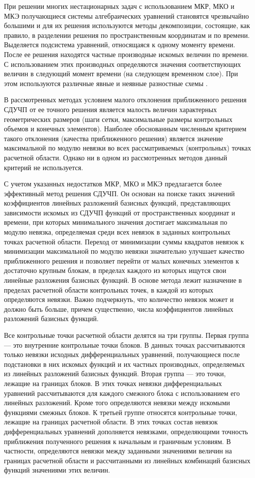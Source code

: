 \documentclass[a4paper,12pt]{article}
\begin{document}
При решении многих нестационарных задач с использованием МКР, МКО и
МКЭ получающиеся системы алгебраических уравнений становятся
чрезвычайно большими и для их решения используются методы
декомпозиции, состоящие, как правило, в разделении решения по
пространственным координатам и по времени.  Выделяется подсистема
уравнений, относящаяся к одному моменту времени.  После ее решения
находятся частные производные искомых величин по времени.  С
использованием этих производных определяются значения соответствующих
величин в следующий момент времени (на следующем временном слое). При
этом используются различные явные и неявные разностные схемы
\cite{J2012}.

В рассмотренных методах условием малого отклонения приближенного решения
СДУЧП от ее точного решения является малость величин характерных
геометрических размеров (шаги сетки, максимальные размеры контрольных
объемов и конечных элементов). Наиболее обоснованным численным критерием
такого отклонения (качества приближенного решения) является значение
максимальной по модулю невязки во всех рассматриваемых (контрольных) точках
расчетной области. Однако ни в одном из рассмотренных методов данный
критерий не используется. 

С учетом указанных недостатков МКР, МКО и МКЭ предлагается более
эффективный метод решения СДУЧП. Он основан на поиске таких значений
коэффициентов линейных разложений базисных функций, представляющих
зависимости искомых из СДУЧП функций от пространственных координат и
времени, при которых минимального значения достигает максимальная по модулю
невязка, определяемая среди всех невязок в заданных контрольных точках
расчетной области. Переход от минимизации суммы квадратов невязок к
минимизации максимальной по модулю невязки значительно улучшает качество
приближенного решения и позволяет перейти от малых конечных элементов к
достаточно крупным блокам, в пределах каждого из которых ищутся свои
линейные разложения базисных функций. В основе метода лежит назначение в
пределах расчетной области контрольных точек, в каждой из которых
определяются невязки. Важно подчеркнуть, что количество невязок может
и должно быть больше, причем существенно, числа коэффициентов линейных
разложений базисных функций.

Все контрольные точки расчетной области делятся на три группы. Первая
группа — это внутренние контрольные точки блоков. В данных точках
рассчитываются только невязки исходных дифференциальных уравнений,
получающиеся после подстановки в них искомых функций и их частных
производных, определяемых из линейных разложений базисных функций. Вторая
группа — это точки, лежащие на границах блоков. В этих точках невязки
дифференциальных уравнений рассчитываются для каждого смежного блока с
использованием его линейных разложений. Кроме того определяются невязки
между искомыми функциями смежных блоков. К третьей группе относятся
контрольные точки, лежащие на границах расчетной области. В этих точках
состав невязок дифференциальных уравнений дополняется невязками,
определяющими точность приближения полученного решения к начальным и
граничным условиям. В частности, определяются невязки между заданными
значениями величин на границах расчетной области и рассчитанными из
линейных комбинаций базисных функций значениями этих величин.
\end{document}
